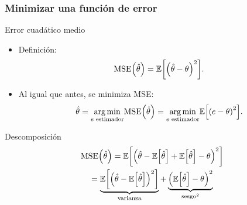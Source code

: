 \documentclass[table]{beamer}
\begin{document}
\begin{frame}
    \frametitle{Minimizar una función de error}
    \begin{block}{Error cuadático medio}
        \begin{itemize}
            \item Definición:
                \begin{equation*}
                    \text{MSE} \parens{\hat{\theta}} = \expected{\parens{\hat{\theta} - \theta}^{2}} .
                \end{equation*}
            \item Al igual que antes, se minimiza MSE:
                \begin{equation*}
                    \hat{\theta} = \underset{e \text{ estimador}}{\arg \min} \text{MSE} \parens{\hat{\theta}} = \underset{e \text{ estimador}}{\arg \min} \expected{\parens{e - \theta}^{2}} .
                \end{equation*}
        \end{itemize}
    \end{block}
    \begin{block}{Descomposición}
        \begin{multline*}
            \text{MSE} \parens{\hat{\theta}} = \expected{\parens{\hat{\theta} - \expected{\hat{\theta}} + \expected{\hat{\theta}} - \theta}^{2}}
            \\
            = \underbrace{\expected{\parens{\hat{\theta} - \expected{\hat{\theta}}}^{2}}}_{\text{varianza}} + \underbrace{\parens{\expected{\hat{\theta}} - \theta}^{2}}_{\text{sesgo}^{2}}
        \end{multline*}
    \end{block}
\end{frame}
\end{document}
